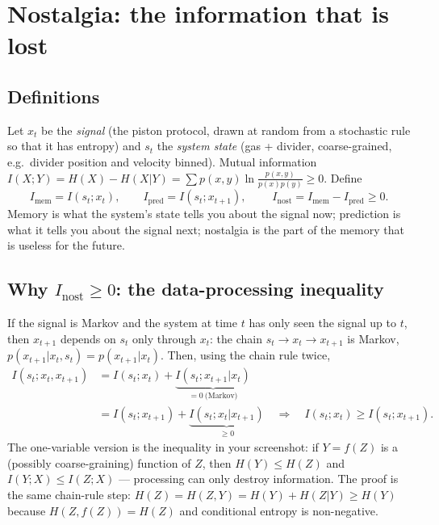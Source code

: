 \documentclass[11pt,a4paper]{article}
\newcommand{\eg}{e.g.\ }
\begin{document}
\section{Nostalgia: the information that is lost}

\subsection{Definitions}
Let $x_t$ be the \emph{signal} (the piston protocol, drawn at random from a stochastic rule so that it has entropy) and $s_t$ the \emph{system state} (gas + divider, coarse-grained, \eg divider position and velocity binned). Mutual information $I(X;Y) = H(X) - H(X|Y) = \sum p(x,y)\ln\frac{p(x,y)}{p(x)p(y)} \ge 0$. Define
\begin{equation}
I_{\mathrm{mem}} = I(s_t; x_t),\qquad
I_{\mathrm{pred}} = I(s_t; x_{t+1}),\qquad
\boxed{\;I_{\mathrm{nost}} = I_{\mathrm{mem}} - I_{\mathrm{pred}} \ge 0.\;}
\end{equation}
Memory is what the system's state tells you about the signal now; prediction is what it tells you about the signal next; nostalgia is the part of the memory that is useless for the future.

\subsection{Why \texorpdfstring{$I_{\mathrm{nost}}\ge0$}{nostalgia >= 0}: the data-processing inequality}
If the signal is Markov and the system at time $t$ has only seen the signal up to $t$, then $x_{t+1}$ depends on $s_t$ only through $x_t$: the chain $s_t \to x_t \to x_{t+1}$ is Markov, $p(x_{t+1}|x_t,s_t) = p(x_{t+1}|x_t)$. Then, using the chain rule twice,
\begin{align}
I(s_t; x_t, x_{t+1}) &= I(s_t;x_t) + \underbrace{I(s_t;x_{t+1}|x_t)}_{=0\ \text{(Markov)}}\\
&= I(s_t;x_{t+1}) + \underbrace{I(s_t;x_t|x_{t+1})}_{\ge0}
\quad\Longrightarrow\quad I(s_t;x_t) \ge I(s_t;x_{t+1}).
\end{align}
The one-variable version is the inequality in your screenshot: if $Y = f(Z)$ is a (possibly coarse-graining) function of $Z$, then $H(Y) \le H(Z)$ and $I(Y;X)\le I(Z;X)$ --- processing can only destroy information. The proof is the same chain-rule step: $H(Z) = H(Z,Y) = H(Y) + H(Z|Y) \ge H(Y)$ because $H(Z,f(Z)) = H(Z)$ and conditional entropy is non-negative.
\end{document}
